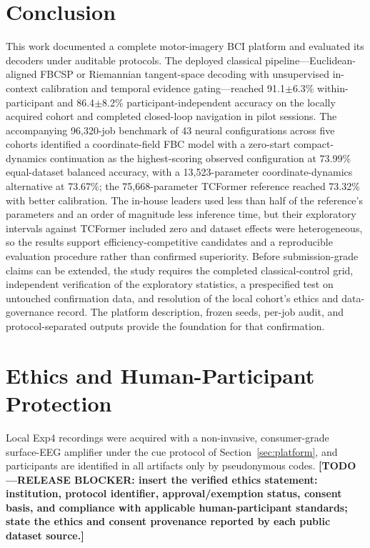 \documentclass[journal,twoside,web]{template/ieeecolor2-tectonic}
\begin{document}
\section{Conclusion}
\label{sec:conclusion}

This work documented a complete motor-imagery BCI platform and evaluated its decoders under auditable protocols. The deployed classical pipeline---Euclidean-aligned FBCSP or Riemannian tangent-space decoding with unsupervised in-context calibration and temporal evidence gating---reached 91.1$\pm$6.3\% within-participant and 86.4$\pm$8.2\% participant-independent accuracy on the locally acquired cohort and completed closed-loop navigation in pilot sessions. The accompanying 96,320-job benchmark of 43 neural configurations across five cohorts identified a coordinate-field FBC model with a zero-start compact-dynamics continuation as the highest-scoring observed configuration at 73.99\% equal-dataset balanced accuracy, with a 13,523-parameter coordinate-dynamics alternative at 73.67\%; the 75,668-parameter TCFormer reference reached 73.32\% with better calibration. The in-house leaders used less than half of the reference's parameters and an order of magnitude less inference time, but their exploratory intervals against TCFormer included zero and dataset effects were heterogeneous, so the results support efficiency-competitive candidates and a reproducible evaluation procedure rather than confirmed superiority. Before submission-grade claims can be extended, the study requires the completed classical-control grid, independent verification of the exploratory statistics, a prespecified test on untouched confirmation data, and resolution of the local cohort's ethics and data-governance record. The platform description, frozen seeds, per-job audit, and protocol-separated outputs provide the foundation for that confirmation.

\section*{Ethics and Human-Participant Protection}

Local Exp4 recordings were acquired with a non-invasive, consumer-grade surface-EEG amplifier under the cue protocol of Section~\ref{sec:platform}, and participants are identified in all artifacts only by pseudonymous codes. \textbf{[TODO---RELEASE BLOCKER: insert the verified ethics statement: institution, protocol identifier, approval/exemption status, consent basis, and compliance with applicable human-participant standards; state the ethics and consent provenance reported by each public dataset source.]}
\end{document}
